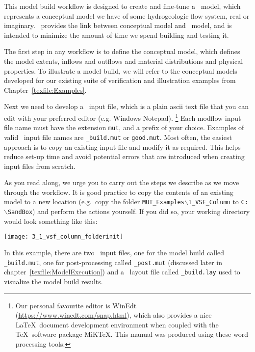 \label{chapter:ModelBuild}
This model build workflow
is designed to create and fine-tune a \mfus\ model, which represents a conceptual model we have of some hydrogeologic flow system, real or imaginary. \mut\ provides the link between conceptual model and \mfus\ model, and is intended to minimize the amount of time we spend building and testing it.

The first step in any workflow is to define the conceptual model, which defines the model extents, inflows and outflows and material distributions and physical properties.  To illustrate a model build, we will refer to the conceptual models developed for our existing suite of verification and illustration examples from Chapter~\ref{texfile:Examples}.

Next we need to develop a \mut\ input file, which is a plain ascii text file that you can edit with your preferred editor (e.g. Windows Notepad). \footnote{Our personal favourite editor is WinEdt (\url{https://www.winedt.com/snap.html}), which also provides a nice \LaTeX\ document development environment when coupled with the \TeX\ software package MiKTeX.  This manual was produced using these word processing tools.}
Each modflow input file name must have the extension \texttt{mut}, and a prefix of your choice. Examples of valid \mut\ input file names are \texttt{\_build.mut} or \texttt{good.mut}. Most often, the easiest approach is to copy an existing input file and modify it as required.  This helps reduce set-up time and avoid potential errors that are introduced when creating input files from scratch.

As you read along, we urge you to carry out the steps we describe as we move through the workflow.  It is good practice to copy the contents of an existing model to a new location (e.g.\ copy the folder \texttt{MUT\_Examples$\backslash$1\_VSF\_Column} to \texttt{C:$\backslash$SandBox}) and perform the actions yourself.  If you did so, your working directory would look something like this:

    \texttt{[image: 3\_1\_vsf\_column\_folderinit]}

In this example, there are two \mut\ input files, one for the model build called \texttt{\_build.mut}, one for post-processing called \texttt{\_post.mut} (discussed later in chapter~\ref{texfile:ModelExecution}) and a \tecplot\ layout file called \texttt{\_build.lay} used to visualize the model build results.

